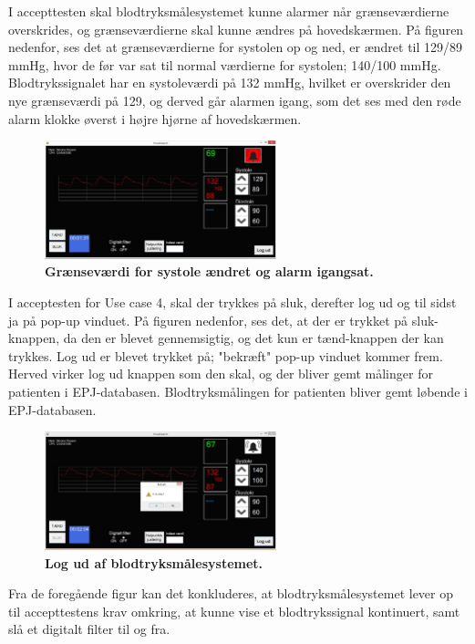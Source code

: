 I accepttesten skal blodtryksmålesystemet kunne alarmer når grænseværdierne overskrides, og grænseværdierne skal kunne ændres på hovedskærmen. På figuren nedenfor, ses det at grænseværdierne for systolen op og ned, er ændret til 129/89 mmHg, hvor de før var sat til normal værdierne for systolen; 140/100 mmHg. Blodtrykssignalet har en systoleværdi på 132 mmHg, hvilket er overskrider den nye grænseværdi på 129, og derved går alarmen igang, som det ses med den røde alarm klokke øverst i højre hjørne af hovedskærmen. 
\begin{figure}[H]
\includegraphics[width =0.6\textwidth , center]{billeder/IThovedGUIAlarm}
\caption{\textbf{Grænseværdi for systole ændret og alarm igangsat.}}
\end{figure}
I acceptesten for Use case 4, skal der trykkes på sluk, derefter log ud og til sidst ja på pop-up vinduet. På figuren nedenfor, ses det, at der er trykket på sluk-knappen, da den er blevet gennemsigtig, og det kun er tænd-knappen der kan trykkes. Log ud er blevet trykket på; "bekræft" pop-up vinduet kommer frem. Herved virker log ud knappen som den skal, og der bliver gemt målinger for patienten i EPJ-databasen. Blodtryksmålingen for patienten bliver gemt løbende i EPJ-databasen. 
\begin{figure}[H]
\includegraphics[width =0.6\textwidth , center]{billeder/IThovedGUILogUd}
\caption{\textbf{Log ud af blodtryksmålesystemet.}}
\end{figure}
Fra de foregående figur kan det konkluderes, at blodtryksmålesystemet lever op til accepttestens krav omkring, at kunne vise et blodtrykssignal kontinuert, samt slå et digitalt filter til og fra. \\\\
